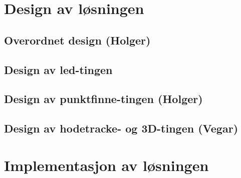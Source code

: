 \section{Design av l\o sningen}

	\subsection{Overordnet design (Holger)}
	
		
	
	\subsection{Design av led-tingen}
	
		
	
	\subsection{Design av punktfinne-tingen (Holger)}
	
		
	
	\subsection{Design av hodetracke- og 3D-tingen (Vegar)}
	
		
	
\section{Implementasjon av l\o sningen}

	